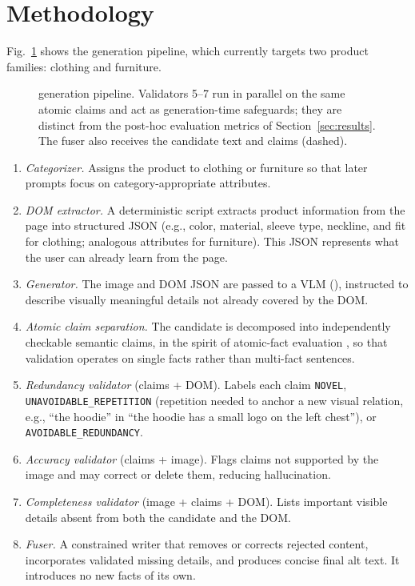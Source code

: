 \section{Methodology}
Fig.~\ref{fig:pipeline} shows the \sys generation pipeline, which currently targets two product families: clothing and furniture.

\begin{figure}[t]
\centering

\caption{\sys generation pipeline. Validators 5--7 run in parallel on the same atomic claims and act as generation-time safeguards; they are distinct from the post-hoc evaluation metrics of Section~\ref{sec:results}. The fuser also receives the candidate text and claims (dashed).}
\label{fig:pipeline}
\end{figure}

\begin{enumerate}
\setlength{\itemsep}{1pt}
\item \textit{Categorizer.} Assigns the product to clothing or furniture so that later prompts focus on category-appropriate attributes.
\item \textit{DOM extractor.} A deterministic script extracts product information from the page into structured JSON (e.g., color, material, sleeve type, neckline, and fit for clothing; analogous attributes for furniture). This JSON represents what the user can already learn from the page.
\item \textit{Generator.} The image and DOM JSON are passed to a VLM (\gen), instructed to describe visually meaningful details not already covered by the DOM.
\item \textit{Atomic claim separation.} The candidate is decomposed into independently checkable semantic claims, in the spirit of atomic-fact evaluation \cite{min2023}, so that validation operates on single facts rather than multi-fact sentences.
\item {\sloppy\textit{Redundancy validator} (claims + DOM). Labels each claim \texttt{NOVEL}, \texttt{UNAVOIDABLE\_REPETITION} (repetition needed to anchor a new visual relation, e.g., ``the hoodie'' in ``the hoodie has a small logo on the left chest''), or \texttt{AVOIDABLE\_REDUNDANCY}.\par}
\item \textit{Accuracy validator} (claims + image). Flags claims not supported by the image and may correct or delete them, reducing hallucination.
\item \textit{Completeness validator} (image + claims + DOM). Lists important visible details absent from both the candidate and the DOM.
\item \textit{Fuser.} A constrained writer that removes or corrects rejected content, incorporates validated missing details, and produces concise final alt text. It introduces no new facts of its own.
\end{enumerate}
